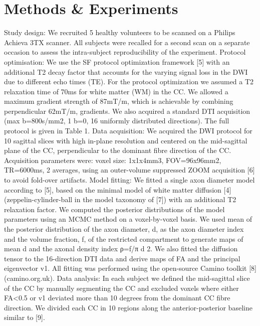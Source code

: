 \section{Methods \& Experiments}
Study design: We recruited 5 healthy volunteers to be scanned on a Philips Achieva 3TX scanner. All subjects were recalled for a second scan on a separate occasion to assess the intra-subject reproducibility of the experiment.
Protocol optimisation: We use the SF protocol optimization framework [5] with an additional T2 decay factor that accounts for the varying signal loss in the DWI due to different echo times (TE). For the protocol optimization we assumed a T2 relaxation time of 70ms for white matter (WM) in the CC. We allowed a maximum gradient strength of 87mT/m, which is achievable by combining perpendicular 62mT/m, gradients. We also acquired a standard DTI acquisition (max b=800s/mm2, 1 b=0, 16 uniformly distributed directions). The full protocol is given in Table 1.
Data acquisition: We acquired the DWI protocol for 10 sagittal slices with high in-plane resolution and centered on the mid-sagittal plane of the CC, perpendicular to the dominant fibre direction of the CC. Acquisition parameters were: voxel size: 1x1x4mm3, FOV=96x96mm2, TR=6000ms, 2 averages, using an outer-volume suppressed ZOOM acquisition [6] to avoid fold-over artifacts.  
Model fitting: We fitted a single axon diameter model according to [5], based on the minimal model of white matter diffusion [4] (zeppelin-cylinder-ball in the model taxonomy of [7]) with an additional T2 relaxation factor. We computed the posterior distributions of the model parameters using an MCMC method on a voxel-by-voxel basis.  We used mean of the posterior distribution of the axon diameter, d, as the axon diameter index and the volume fraction, f, of the restricted compartment to generate maps of mean d and the axonal density index ρ=f/π d 2. We also fitted the diffusion tensor to the 16-direction DTI data and derive maps of FA and the principal eigenvector v1. All fitting was performed using the open-source Camino toolkit [8] (camino.org.uk).
Data analysis: In each subject we defined the mid-sagittal slice of the CC by manually segmenting the CC and excluded voxels where either FA<0.5 or v1 deviated more than 10 degrees from the dominant CC fibre direction. We divided each CC in 10 regions along the anterior-posterior baseline similar to [9]. 

